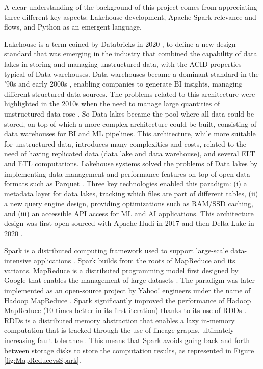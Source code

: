 A clear understanding of the background of this project comes from appreciating three different key aspects: Lakehouse development, Apache Spark relevance and flows, and Python as an emergent language.

Lakehouse is a term coined by Databricks in 2020 \cite{WhatLakehouse2020}, to define a new design standard that was emerging in the industry that combined the capability of data lakes in storing and managing unstructured data, with the \gls{ACID} properties typical of Data warehouses.
Data warehouses became a dominant standard in the '90s and early 2000s \cite{chaudhuriOverviewDataWarehousing1997}, enabling companies to generate \gls{BI} insights, managing different structured data sources. The problems related to this architecture were highlighted in the 2010s when the need to manage large quantities of unstructured data rose \cite{ederUnstructuredData802008}. 
So Data lakes became the pool where all data could be stored, on top of which a more complex architecture could be built, consisting of data warehouses for \gls{BI} and \gls{ML} pipelines.
This architecture, while more suitable for unstructured data, introduces many complexities and costs, related to the need of having replicated data (data lake and data warehouse), and several \gls{ELT} and \gls{ETL} computations.
Lakehouse systems solved the problems of Data lakes by implementing data management and performance features on top of open data formats such as Parquet \cite{DremelMadeSimple}. Three key technologies enabled this paradigm: (i) a metadata layer for data lakes, tracking which files are part of different tables, (ii) a new query engine design, providing optimizations such as RAM/SSD caching, and (iii) an accessible \gls{API} access for \gls{ML} and \gls{AI} applications. This architecture design was first open-sourced with Apache Hudi in 2017 \cite{rajaperumalUberEngineeringIncremental2017} and then Delta Lake in 2020 \cite{armbrustDeltaLakeHighperformance2020}.

Spark is a distributed computing framework used to support large-scale data-intensive applications \cite{zaharia2010spark}. Spark builds from the roots of MapReduce and its variants. MapReduce is a distributed programming model first designed by Google that enables the management of large datasets \cite{dean2004mapreduce}. The paradigm was later implemented as an open-source project by Yahoo! engineers under the name of Hadoop MapReduce \cite{borthakurHadoopDistributedFile2005}. Spark significantly improved the performance of Hadoop MapReduce (10 times better in its first iteration) \cite{zaharia2010spark} thanks to its use of \glspl{RDD} \cite{Zaharia:EECS-2011-82}. \glspl{RDD} is a distributed memory abstraction that enables a lazy in-memory computation that is tracked through the use of lineage graphs, ultimately increasing fault tolerance \cite{Zaharia:EECS-2011-82}. This means that Spark avoids going back and forth between storage disks to store the computation results, as represented in Figure \ref{fig:MapReducevsSpark}.

